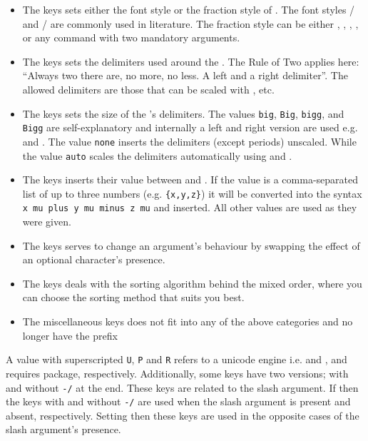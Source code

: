 	\begin{itemize}
		\item The  keys sets either the font style or the fraction style of \meta{\dots}. The font styles / and / are commonly used in literature. The fraction style can be either , , , \req{},  or any command with two mandatory arguments.
		\item The  keys sets the delimiters used around the \meta{\dots}. The Rule of Two applies here: \enquote{Always two there are, no more, no less. A left and a right delimiter}. The allowed delimiters are those that can be scaled with ,  etc.
		\item The  keys sets the size of the \meta{\dots}'s delimiters. The values \texttt{big}, \texttt{Big}, \texttt{bigg}, and \texttt{Bigg} are self-explanatory and internally a left and right version are used e.g.  and . The value \texttt{none} inserts the delimiters (except periods) unscaled. While the value \texttt{auto} scales the delimiters automatically using  and .
		\item The  keys inserts their value between \meta{\dots} and \meta{\dots}. If the value is a comma-separated list of up to three numbers (e.g. \texttt{\{x,y,z\}}) it will be converted into the syntax \texttt{ x mu plus y mu minus z mu} and inserted. All other values are used as they were given.
		\item The  keys serves to change an argument's behaviour by swapping the effect of an optional character's presence.
		\item The  keys deals with the sorting algorithm behind the mixed order, where you can choose the sorting method that suits you best.
		\item The miscellaneous keys does not fit into any of the above categories and no longer have the prefix 
	\end{itemize}
	
	\begin{note}
		A value with superscripted \texttt{U}, \texttt{P} and \texttt{R} refers to a unicode engine i.e. \luatex{} and \xetex, \pdftex{} and requires package, respectively. Additionally, some keys have two versions; with and without \texttt{-/} at the end. These keys are related to the slash argument. If  then the keys with and without \texttt{-/} are used when the slash argument is present and absent, respectively. Setting  then these keys are used in the opposite cases of the slash argument's presence.
	\end{note}
	
